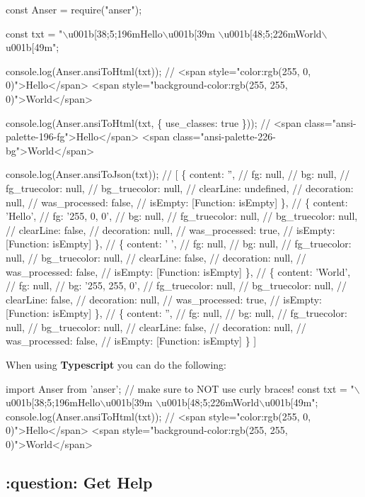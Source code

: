 \begin{DoxyCode}
const Anser = require("anser");

const txt = "\(\backslash\)u001b[38;5;196mHello\(\backslash\)u001b[39m \(\backslash\)u001b[48;5;226mWorld\(\backslash\)u001b[49m";

console.log(Anser.ansiToHtml(txt));
// <span style="color:rgb(255, 0, 0)">Hello</span> <span style="background-color:rgb(255, 255,
       0)">World</span>

console.log(Anser.ansiToHtml(txt, \{ use\_classes: true \}));
// <span class="ansi-palette-196-fg">Hello</span> <span class="ansi-palette-226-bg">World</span>

console.log(Anser.ansiToJson(txt));
// [ \{ content: '',
//     fg: null,
//     bg: null,
//     fg\_truecolor: null,
//     bg\_truecolor: null,
//     clearLine: undefined,
//     decoration: null,
//     was\_processed: false,
//     isEmpty: [Function: isEmpty] \},
//   \{ content: 'Hello',
//     fg: '255, 0, 0',
//     bg: null,
//     fg\_truecolor: null,
//     bg\_truecolor: null,
//     clearLine: false,
//     decoration: null,
//     was\_processed: true,
//     isEmpty: [Function: isEmpty] \},
//   \{ content: ' ',
//     fg: null,
//     bg: null,
//     fg\_truecolor: null,
//     bg\_truecolor: null,
//     clearLine: false,
//     decoration: null,
//     was\_processed: false,
//     isEmpty: [Function: isEmpty] \},
//   \{ content: 'World',
//     fg: null,
//     bg: '255, 255, 0',
//     fg\_truecolor: null,
//     bg\_truecolor: null,
//     clearLine: false,
//     decoration: null,
//     was\_processed: true,
//     isEmpty: [Function: isEmpty] \},
//   \{ content: '',
//     fg: null,
//     bg: null,
//     fg\_truecolor: null,
//     bg\_truecolor: null,
//     clearLine: false,
//     decoration: null,
//     was\_processed: false,
//     isEmpty: [Function: isEmpty] \} ]
\end{DoxyCode}


When using {\bfseries Typescript} you can do the following\+: 
\begin{DoxyCode}
import Anser from 'anser'; // make sure to NOT use curly braces!
const txt = "\(\backslash\)u001b[38;5;196mHello\(\backslash\)u001b[39m \(\backslash\)u001b[48;5;226mWorld\(\backslash\)u001b[49m";
console.log(Anser.ansiToHtml(txt));
// <span style="color:rgb(255, 0, 0)">Hello</span> <span style="background-color:rgb(255, 255,
       0)">World</span>
\end{DoxyCode}


\subsection*{\+:question\+: Get Help}

